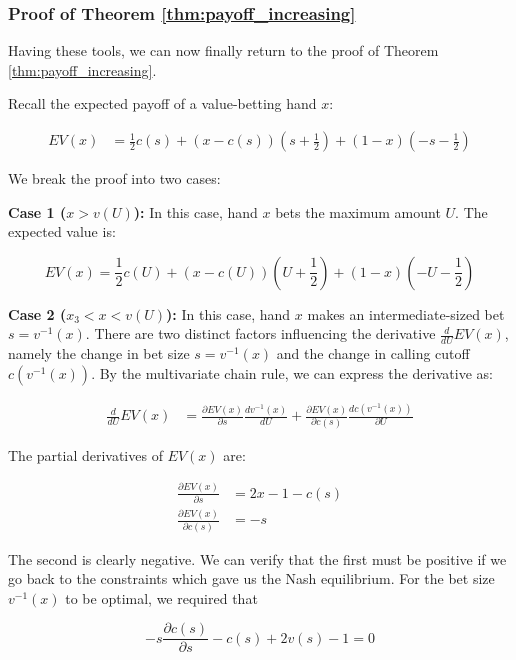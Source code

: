 \documentclass[../../main/main.tex]{subfiles}
\begin{document}
\subsubsection{Proof of Theorem \ref{thm:payoff_increasing}}

Having these tools, we can now finally return to the proof of Theorem \ref{thm:payoff_increasing}.

\begin{customproof}
    Recall the expected payoff of a value-betting hand $x$:

    \begin{align*}
        EV(x) & = \frac{1}{2} c(s) + (x - c(s)) \left(s+\frac{1}{2}\right) + (1-x) \left(-s-\frac{1}{2}\right)
    \end{align*}

    We break the proof into two cases:

    \textbf{Case 1 ($x > v(U)$):} In this case, hand $x$ bets the maximum amount $U$. The expected value is:
    
    $$ EV(x) = \frac{1}{2} c(U) + (x - c(U)) \left(U+\frac{1}{2}\right) + (1-x) \left(-U-\frac{1}{2}\right) $$ 

    \textbf{Case 2 ($x_3 < x < v(U)$):} In this case, hand $x$ makes an intermediate-sized bet $s = v^{-1}(x)$. There are two distinct factors influencing the derivative $\frac{d}{dU} EV(x)$, namely the change in bet size $s = v^{-1}(x)$ and the change in calling cutoff $c(v^{-1}(x))$. By the multivariate chain rule, we can express the derivative as:

    \begin{align*}
        \frac{d}{dU} EV(x) & = \frac{\partial EV(x)}{\partial s} \frac{d v^{-1}(x)}{d U} + \frac{\partial EV(x)}{\partial c(s)} \frac{d c(v^{-1}(x))}{\partial U}
    \end{align*}

    The partial derivatives of $EV(x)$ are:

    \begin{align*}
        \frac{\partial EV(x)}{\partial s} & = 2x - 1 - c(s) \\
        \frac{\partial EV(x)}{\partial c(s)} & = - s
    \end{align*}

    The second is clearly negative. We can verify that the first must be positive if we go back to the constraints which gave us the Nash equilibrium. For the bet size $v^{-1}(x)$ to be optimal, we required that 

    $$ -s \frac{\partial c(s)}{\partial s} - c(s) + 2v(s) - 1 = 0$$


\end{customproof}
\end{document}
